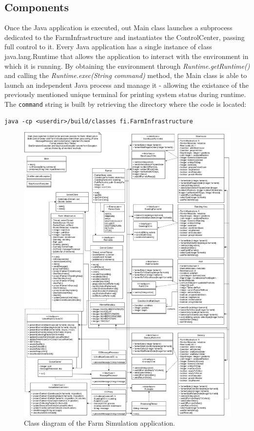 \documentclass[12pt]{article}
\begin{document}
\subsection{Components} %

Once the Java application is executed, out Main class launches a subprocess dedicated to the FarmInfrastructure and instantiates the ControlCenter, passing full 
control to it.
Every Java application has a single instance of class java.lang.Runtime that allows the application to interact with the environment in which it is running.
By obtaining the environment through \textit{Runtime.getRuntime()} and calling the \textit{Runtime.exec(String command)} method, the Main class is able to launch 
an independent Java process and manage it - allowing the existance of the previously mentioned unique terminal for printing system status during runtime.
The \texttt{command} string is built by retrieving the directory where the code is located:  

\texttt{java -cp <userdir>/build/classes fi.FarmInfrastructure}

\begin{figure}[H]
  \centering
  \begin{minipage}{1.05\textwidth}
    \centering
    \includegraphics[width=\linewidth]{img/ClassDiagram.png}
  \end{minipage}%
  \caption{Class diagram of the Farm Simulation application.}
  \label{ClassDiagram}
\end{figure} 
\end{document}
